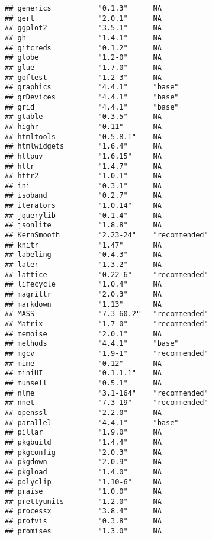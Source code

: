 \documentclass[
]{article}
\begin{document}
\begin{verbatim}
## generics           "0.1.3"      NA           
## gert               "2.0.1"      NA           
## ggplot2            "3.5.1"      NA           
## gh                 "1.4.1"      NA           
## gitcreds           "0.1.2"      NA           
## globe              "1.2-0"      NA           
## glue               "1.7.0"      NA           
## goftest            "1.2-3"      NA           
## graphics           "4.4.1"      "base"       
## grDevices          "4.4.1"      "base"       
## grid               "4.4.1"      "base"       
## gtable             "0.3.5"      NA           
## highr              "0.11"       NA           
## htmltools          "0.5.8.1"    NA           
## htmlwidgets        "1.6.4"      NA           
## httpuv             "1.6.15"     NA           
## httr               "1.4.7"      NA           
## httr2              "1.0.1"      NA           
## ini                "0.3.1"      NA           
## isoband            "0.2.7"      NA           
## iterators          "1.0.14"     NA           
## jquerylib          "0.1.4"      NA           
## jsonlite           "1.8.8"      NA           
## KernSmooth         "2.23-24"    "recommended"
## knitr              "1.47"       NA           
## labeling           "0.4.3"      NA           
## later              "1.3.2"      NA           
## lattice            "0.22-6"     "recommended"
## lifecycle          "1.0.4"      NA           
## magrittr           "2.0.3"      NA           
## markdown           "1.13"       NA           
## MASS               "7.3-60.2"   "recommended"
## Matrix             "1.7-0"      "recommended"
## memoise            "2.0.1"      NA           
## methods            "4.4.1"      "base"       
## mgcv               "1.9-1"      "recommended"
## mime               "0.12"       NA           
## miniUI             "0.1.1.1"    NA           
## munsell            "0.5.1"      NA           
## nlme               "3.1-164"    "recommended"
## nnet               "7.3-19"     "recommended"
## openssl            "2.2.0"      NA           
## parallel           "4.4.1"      "base"       
## pillar             "1.9.0"      NA           
## pkgbuild           "1.4.4"      NA           
## pkgconfig          "2.0.3"      NA           
## pkgdown            "2.0.9"      NA           
## pkgload            "1.4.0"      NA           
## polyclip           "1.10-6"     NA           
## praise             "1.0.0"      NA           
## prettyunits        "1.2.0"      NA           
## processx           "3.8.4"      NA           
## profvis            "0.3.8"      NA           
## promises           "1.3.0"      NA           

\end{verbatim}
\end{document}
